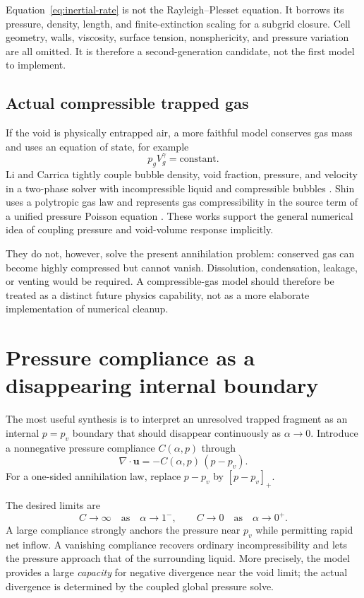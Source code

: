 \documentclass[11pt]{article}
\newcommand{\pos}[1]{\left[#1\right]_+}
\newcommand{\divg}{\nabla\!\cdot}
\newcommand{\uv}{\boldsymbol{u}}
\begin{document}
Equation~\eqref{eq:inertial-rate} is not the Rayleigh--Plesset equation.  It borrows its
pressure, density, length, and finite-extinction scaling for a subgrid closure.  Cell
geometry, walls, viscosity, surface tension, nonsphericity, and pressure variation are
all omitted.  It is therefore a second-generation candidate, not the first model to
implement.

\subsection{Actual compressible trapped gas}

If the void is physically entrapped air, a more faithful model conserves gas mass and
uses an equation of state, for example
\begin{equation}
  p_g V_g^\gamma=\text{constant}.
\end{equation}
Li and Carrica tightly couple bubble density, void fraction, pressure, and velocity in a
two-phase solver with incompressible liquid and compressible bubbles
\cite{li-carrica2018}.  Shin uses a polytropic gas law and represents gas compressibility
in the source term of a unified pressure Poisson equation \cite{shin2020}.  These works
support the general numerical idea of coupling pressure and void-volume response
implicitly.

They do not, however, solve the present annihilation problem: conserved gas can become
highly compressed but cannot vanish.  Dissolution, condensation, leakage, or venting
would be required.  A compressible-gas model should therefore be treated as a distinct
future physics capability, not as a more elaborate implementation of numerical cleanup.

\section{Pressure compliance as a disappearing internal boundary}

The most useful synthesis is to interpret an unresolved trapped fragment as an internal
\(p=p_v\) boundary that should disappear continuously as \(\alpha\to0\).  Introduce a
nonnegative pressure compliance \(C(\alpha,p)\) through
\begin{equation}
  \boxed{\divg\uv=-C(\alpha,p)\,(p-p_v).}
  \label{eq:compliance}
\end{equation}
For a one-sided annihilation law, replace \(p-p_v\) by \(\pos{p-p_v}\).

The desired limits are
\begin{equation}
  C\longrightarrow\infty \quad\text{as}\quad \alpha\to1^{-},
  \qquad
  C\longrightarrow0 \quad\text{as}\quad \alpha\to0^{+}.
  \label{eq:compliance-limits}
\end{equation}
A large compliance strongly anchors the pressure near \(p_v\) while permitting rapid
net inflow.  A vanishing compliance recovers ordinary incompressibility and lets the
pressure approach that of the surrounding liquid.  More precisely, the model provides a
large \emph{capacity} for negative divergence near the void limit; the actual divergence
is determined by the coupled global pressure solve.
\end{document}
